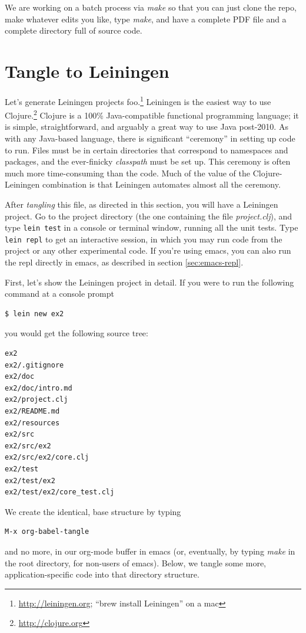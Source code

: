 \documentclass[11pt]{article}
\begin{document}
We are working on a batch process via \emph{make} so that you can just
clone the repo, make whatever edits you like, type \emph{make}, and have
a complete PDF file and a complete directory full of source code.
\section{Tangle to Leiningen}
\label{sec-2}
Let's generate Leiningen projects foo.\footnote{\url{http://leiningen.org}; ``brew
  install Leiningen'' on a mac}
Leiningen is the easiest way to use Clojure.\footnote{\url{http://clojure.org}}
Clojure is a 100\% Java-compatible functional programming language;
it is simple, straightforward, and arguably a great way to use Java
post-2010. As with any Java-based language, there is significant
``ceremony'' in setting up code to run. Files must be in certain
directories that correspond to namespaces and packages, and the
ever-finicky \emph{classpath} must be set up. This ceremony is often much
more time-consuming than the code. Much of the value of the
Clojure-Leiningen combination is that Leiningen automates almost all
the ceremony.

After \emph{tangling} this file, as directed in this section, you will
have a Leiningen project. Go to the project directory (the one
containing the file \emph{project.clj}), and type \verb|lein test| in a
console or terminal window, running all the unit tests. Type
\verb|lein repl| to get an interactive session, in which you may run
code from the project or any other experimental code. If you're
using emacs, you can also run the repl directly in emacs, as
described in section \ref{sec:emacs-repl}.

First, let's show the Leiningen project in detail. If you were to
run the following command at a console prompt
\begin{verbatim}
$ lein new ex2
\end{verbatim}
you would get the following source tree:
\begin{verbatim}
ex2
ex2/.gitignore
ex2/doc
ex2/doc/intro.md
ex2/project.clj
ex2/README.md
ex2/resources
ex2/src
ex2/src/ex2
ex2/src/ex2/core.clj
ex2/test
ex2/test/ex2
ex2/test/ex2/core_test.clj
\end{verbatim}
We create the identical, base structure by typing
\begin{verbatim}
M-x org-babel-tangle
\end{verbatim}
and no more, in our org-mode buffer in emacs (or, eventually, by
typing \emph{make} in the root directory, for non-users of emacs). Below,
we tangle some more, application-specific code into that directory
structure.
\end{document}
